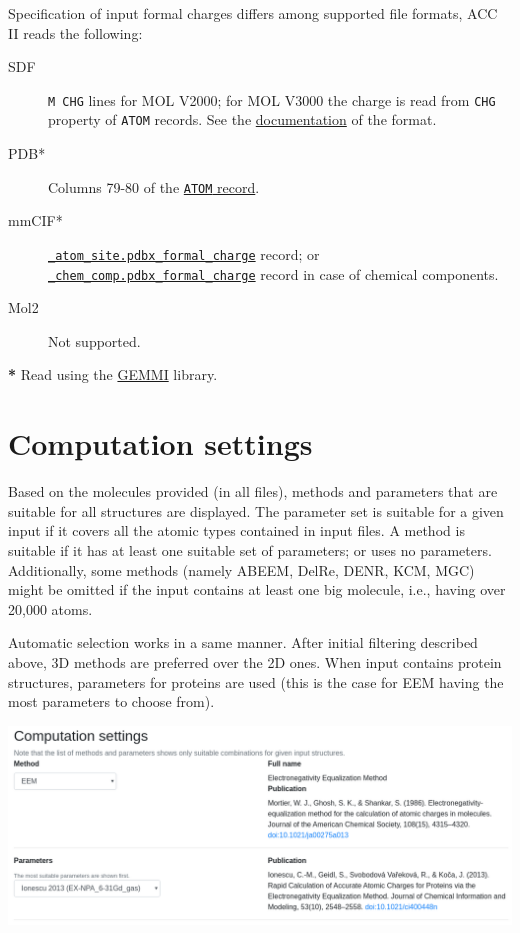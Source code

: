 \documentclass[oneside]{memoir}
\begin{document}
Specification of input formal charges differs among supported file formats, ACC II reads the following:

\begin{description}
\item[SDF] \texttt{M  CHG} lines for MOL V2000; for MOL V3000 the charge is read from \texttt{CHG} property of \texttt{ATOM} records. See the \href{https://www.daylight.com/meetings/mug05/Kappler/ctfile.pdf}{documentation} of the format.
\item[PDB*] Columns 79-80 of the \href{http://www.wwpdb.org/documentation/file-format-content/format33/sect9.html#ATOM}{\texttt{ATOM} record}.
\item[mmCIF*] \href{http://mmcif.wwpdb.org/dictionaries/mmcif_pdbx_v50.dic/Items/_atom_site.pdbx_formal_charge.html}{\texttt{\_atom\_site.pdbx\_formal\_charge}} record; or \href{http://mmcif.wwpdb.org/dictionaries/mmcif_pdbx_v50.dic/Items/_chem_comp.pdbx_formal_charge.html}{\texttt{\_chem\_comp.pdbx\_formal\_charge}} record in case of chemical components.
\item[Mol2] Not supported.
\end{description}

\textbf{*} Read using the \href{https://project-gemmi.github.io/}{GEMMI} library.

\section*{Computation settings}
Based on the molecules provided (in all files), methods and parameters that are suitable for all structures are displayed. The parameter set is suitable for a given input if it covers all the atomic types contained in input files. A method is suitable if it has at least one suitable set of parameters; or uses no parameters. Additionally, some methods (namely ABEEM, DelRe, DENR, KCM, MGC) might be omitted if the input contains at least one big molecule, i.e., having over 20,000 atoms.

Automatic selection works in a same manner. After initial filtering described above, 3D methods are preferred over the 2D ones. When input contains protein structures, parameters for proteins are used (this is the case for EEM having the most parameters to choose from).

\begin{center}
    \includegraphics[width=.9\linewidth]{images/settings.png}
\end{center}
\end{document}
